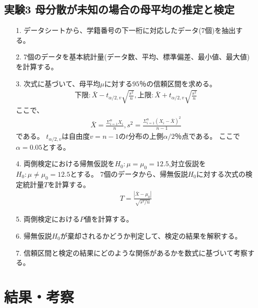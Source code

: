 \documentclass[12pt]{jarticle}
\begin{document}
\subsection{実験3 母分散が未知の場合の母平均の推定と検定}
\begin{itemize}
      \item [1.]データシートから、学籍番号の下一桁に対応したデータ(7個)を抽出する。
      \item [2.]7個のデータを基本統計量(データ数、平均、標準偏差、最小値、最大値)を計算する。
      \item [3.]次式に基づいて、母平均$\mu$に対する$95％$の信頼区間を求める。
            \begin{eqnarray}
                  下限:\bar{X}-t_{\alpha/2,v}\sqrt{\frac{s^2}{n}},　上限:\bar{X}+t_{\alpha/2,v}\sqrt{\frac{s^2}{n}}\nonumber
            \end{eqnarray}
            ここで、
            \begin{eqnarray}
                  \bar{X}=\frac{\Sigma^{n}_{i=1}X_{i}}{n},　s^2=\frac{\Sigma^{n}_{i=1}{(X_{i}-\bar{X})}^2}{n-1} \nonumber
            \end{eqnarray}
            である。
            $t_{\alpha/2,v}$は自由度$v=n-1$の$t$分布の上側$\alpha/2％$点である。
            ここで$\alpha=0.05$とする。
      \item [4.]両側検定における帰無仮説を$H_0:\mu=\mu_0=12.5$,対立仮説を$H_0:\mu\neq\mu_0=12.5$とする。
            7個のデータから、帰無仮説$H_0$に対する次式の検定統計量$T$を計算する。
            \begin{eqnarray}
                  T=\frac{|\bar{X}-\mu_0|}{\sqrt{s^2/n}}\nonumber
            \end{eqnarray}
      \item [5.]両側検定における$P値$を計算する。
      \item [6.]帰無仮説$H_0$が棄却されるかどうか判定して、検定の結果を解釈する。
      \item [7.]信頼区間と検定の結果にどのような関係があるかを数式に基づいて考察する。
\end{itemize}

\section{結果・考察}
\end{document}
